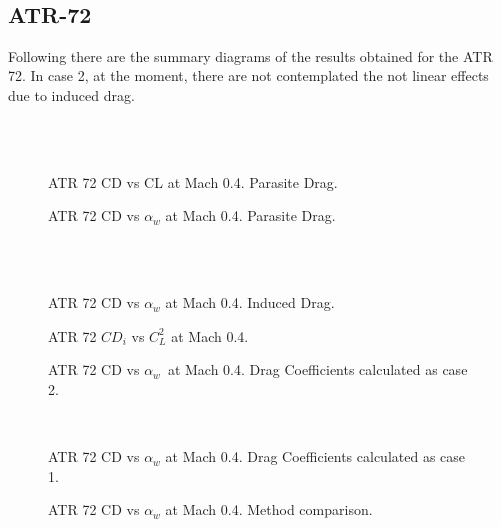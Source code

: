 \noindent \\

\subsection{ATR-72}

Following there are the summary diagrams of the results obtained for the ATR 72. In case 2, at the moment, there are not contemplated the not linear effects due to induced drag.

\noindent \\ \\
\begin{figure}[H]
\centering

\caption{ATR 72 CD vs CL at Mach 0.4. Parasite Drag.}
\label{fig:DragATR}
\end{figure}

\begin{figure}[H]
\centering

\caption{ATR 72 CD vs $\alpha_w$ at Mach 0.4. Parasite Drag.}
\label{fig:DragATR}
\end{figure}
\noindent \\\\
\begin{figure}[H]
\centering

\caption{ATR 72 CD vs $\alpha_w$ at Mach 0.4. Induced Drag.}
\label{fig:DragATR}
\end{figure}

\begin{figure}[H]
\centering

\caption{ATR 72 $CD_i$ vs $C_L^2$  at Mach 0.4.}
\label{fig:DragATR}
\end{figure}

\begin{figure}[H]
\centering

\caption{ATR 72 CD vs $\alpha_w$\  at Mach 0.4. Drag Coefficients calculated as case 2.}
\label{fig:DragATR}
\end{figure}
\noindent \\
\begin{figure}[H]
\centering

\caption{ATR 72 CD vs $\alpha_w$  at Mach 0.4. Drag Coefficients calculated as case 1.}
\label{fig:DragATR}
\end{figure}

\begin{figure}[H]
\centering

\caption{ATR 72 CD vs $\alpha_w$  at Mach 0.4. Method comparison.}
\label{fig:DragATR}
\end{figure}

